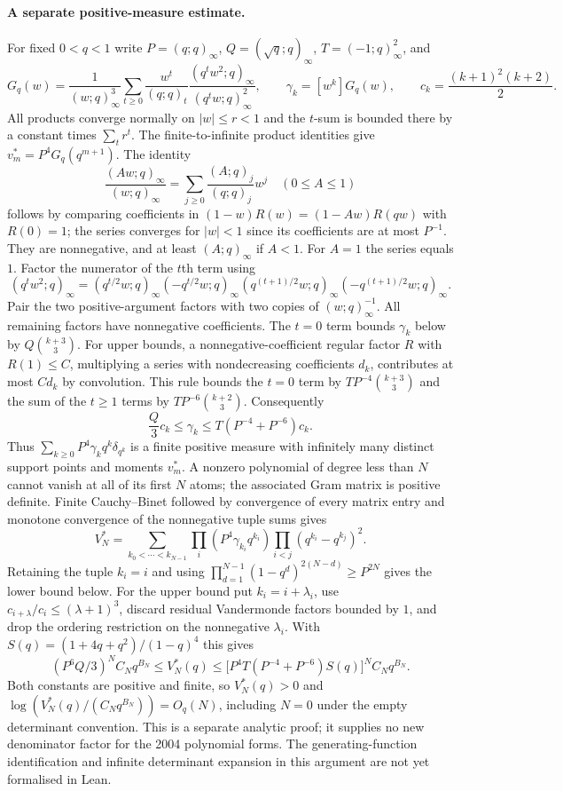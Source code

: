 \paragraph{A separate positive-measure estimate.}
For fixed $0<q<1$ write $P=(q;q)_\infty$, $Q=(\sqrt q;q)_\infty$,
$T=(-1;q)_\infty^2$, and
\[
 G_q(w)=\frac1{(w;q)_\infty^3}\sum_{t\ge0}\frac{w^t}{(q;q)_t}
          \frac{(q^tw^2;q)_\infty}{(q^tw;q)_\infty^2},
 \qquad \gamma_k=[w^k]G_q(w),\qquad c_k=\frac{(k+1)^2(k+2)}2.
\]
All products converge normally on $|w|\le r<1$ and the $t$-sum is bounded
there by a constant times $\sum_t r^t$.  The finite-to-infinite product
identities give $v_m^*=P^4G_q(q^{m+1})$.
The identity
\[
 \frac{(Aw;q)_\infty}{(w;q)_\infty}
   =\sum_{j\ge0}\frac{(A;q)_j}{(q;q)_j}w^j\quad(0\le A\le1)
\]
follows by comparing coefficients in
$(1-w)R(w)=(1-Aw)R(qw)$ with $R(0)=1$; the series converges for $|w|<1$
since its coefficients are at most $P^{-1}$.  They are nonnegative, and
at least $(A;q)_\infty$ if $A<1$.  For $A=1$ the series equals $1$.
Factor the numerator of the $t$th term using
\[
 (q^tw^2;q)_\infty=(q^{t/2}w;q)_\infty(-q^{t/2}w;q)_\infty
 (q^{(t+1)/2}w;q)_\infty(-q^{(t+1)/2}w;q)_\infty.
\]
Pair the two positive-argument factors with two copies of
$(w;q)_\infty^{-1}$.  All remaining factors have nonnegative
coefficients.  The $t=0$ term bounds $\gamma_k$ below by
$Q\binom{k+3}3$.  For upper bounds, a nonnegative-coefficient regular
factor $R$ with $R(1)\le C$, multiplying a series with nondecreasing
coefficients $d_k$, contributes at most $Cd_k$ by convolution.
This rule bounds the $t=0$ term by $TP^{-4}\binom{k+3}3$ and the sum
of the $t\ge1$ terms by $TP^{-6}\binom{k+2}3$.  Consequently
\[
 \frac Q3 c_k\le\gamma_k\le T(P^{-4}+P^{-6})c_k.
\]
Thus $\sum_{k\ge0}P^4\gamma_kq^k\delta_{q^k}$ is a finite positive measure
with infinitely many distinct support points and moments $v_m^*$.
A nonzero polynomial of degree less than $N$ cannot vanish at all of its
first $N$ atoms; the associated Gram matrix is positive definite.
Finite Cauchy--Binet followed by convergence of every matrix entry and
monotone convergence of the nonnegative tuple sums gives
\[
 V_N^*=\sum_{k_0<\cdots<k_{N-1}}
 \prod_i(P^4\gamma_{k_i}q^{k_i})\prod_{i<j}(q^{k_i}-q^{k_j})^2.
\]
Retaining the tuple $k_i=i$ and using
$\prod_{d=1}^{N-1}(1-q^d)^{2(N-d)}\ge P^{2N}$ gives the lower bound
below.  For the upper bound put $k_i=i+\lambda_i$, use
$c_{i+\lambda}/c_i\le(\lambda+1)^3$, discard residual Vandermonde factors
bounded by $1$, and drop the ordering restriction on the nonnegative
$\lambda_i$.  With $S(q)=(1+4q+q^2)/(1-q)^4$ this gives
\[
 (P^6Q/3)^N C_Nq^{B_N}\le V_N^*(q)
 \le\bigl[P^4T(P^{-4}+P^{-6})S(q)\bigr]^N C_Nq^{B_N}.
\]
Both constants are positive and finite, so $V_N^*(q)>0$ and
$\log(V_N^*(q)/(C_Nq^{B_N}))=O_q(N)$, including $N=0$ under the empty
determinant convention.  This is a separate analytic proof; it supplies no
new denominator factor for the 2004 polynomial forms.
The generating-function identification and infinite determinant expansion
in this argument are not yet formalised in Lean.

